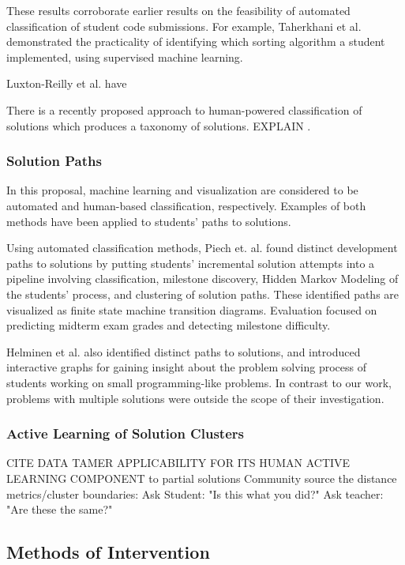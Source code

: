 \documentclass[12pt]{article}
\begin{document}
These results corroborate earlier results on the feasibility of automated classification of student code submissions. For example, Taherkhani et al. \cite{taherkhani12} demonstrated the practicality of identifying which sorting algorithm a student implemented, using supervised machine learning.

Luxton-Reilly et al. \cite{Luxton13} have 

There is a recently proposed approach to human-powered classification of solutions which produces a taxonomy of solutions. EXPLAIN .

\subsubsection{Solution Paths}

In this proposal, machine learning and visualization are considered to be automated and human-based classification, respectively. Examples of both methods have been applied to students' paths to solutions.

Using automated classification methods, Piech et. al. \cite{Piech} found distinct development paths to solutions by putting students' incremental solution attempts into a pipeline involving classification, milestone discovery, Hidden Markov Modeling of the students' process, and clustering of solution paths. These identified paths are visualized as finite state machine transition diagrams. Evaluation focused on predicting midterm exam grades and detecting milestone difficulty.

Helminen et al. \cite{ICERHelminen} also identified distinct paths to solutions, and introduced interactive graphs for gaining insight about the problem solving process of students working on small programming-like problems. In contrast to our work, problems with multiple solutions were outside the scope of their investigation.



\subsubsection{Active Learning of Solution Clusters}

CITE DATA TAMER APPLICABILITY FOR ITS HUMAN ACTIVE LEARNING COMPONENT to partial solutions
Community source the distance metrics/cluster boundaries: Ask Student: "Is this what you did?" Ask teacher: "Are these the same?"

\subsection{Methods of Intervention}
\end{document}
